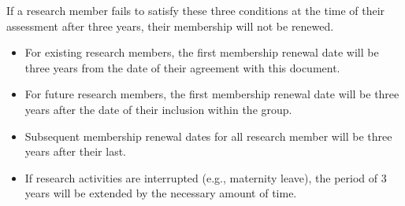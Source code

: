 \documentclass[a4paper, 11pt]{scrartcl}
\begin{document}
If a research member fails to satisfy these three conditions at the time of their assessment after three years, their membership will not be renewed.

\begin{itemize}

\item For existing research members, the first membership renewal date will be three years from the date of their agreement with this document. 
\item For future research members, the first membership renewal date will be three years after the date of their inclusion within the group. 
\item Subsequent membership renewal dates for all research member will be three years after their last.
\item If research activities are interrupted (e.g., maternity leave), the period of 3 years will be extended by the necessary amount of time.
\end{itemize}
\end{document}
